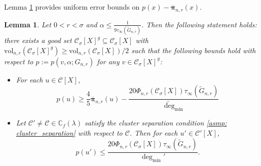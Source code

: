 \documentclass{article}
\newcommand{\vol}{\mathrm{vol}}
\newcommand{\1}{\mathbf{1}}
\newcommand{\pbf}{p}        %
\newcommand{\pibf}{\bm{\pi}}
\newcommand{\Xbf}{X}             %
\newcommand{\Cbb}{\mathbb{C}}
\newcommand{\Cset}{\mathcal{C}}
\newcommand{\Csig}{\Cset_{\sigma}}
\newcommand{\degminpr}{\deg_{\min}'}
\newcommand{\degminwt}{\widetilde{\deg}_{\min}}
\theoremstyle{aldenthm}
\newtheorem{lemma}{Lemma}
\theoremstyle{aldenrmrk}
\begin{document}
Lemma \ref{lem: setup} provides uniform error bounds on $\pbf(x) - \overline{\pibf}_{n,r}(x)$. 

\begin{lemma} 
	\label{lem: setup}
	Let $0 < r < \sigma$ and $\alpha \leq \frac{1}{9 \tau_{\infty}(\widetilde{G}_{n,r})}$. Then the following statement holds: there exists a good set $\Csig[\Xbf]^g \subseteq \Csig[\Xbf]$ with $\vol_{n,r}(\Csig[\Xbf]^g) \geq \vol_{n,r}(\Csig[\Xbf])/2$ such that the following bounds hold with respect to $\pbf := \pbf(v,\alpha;G_{n,r})$ for any $v \in \Csig[\Xbf]^g$:
	\begin{itemize}
		\item For each $u \in \Cset[\Xbf]$,
		\begin{equation}
		\label{eqn: lower_bound_PPR_in_cluster}
		\pbf(u) \geq \frac{4}{5} \overline{\pibf}_{n,r}(u) - \frac{20 \Phi_{n,r}(\Csig[\Xbf]) \tau_{\infty}(\widetilde{G}_{n,r})}{\degminwt}
		\end{equation}
		\item Let $\Cset' \neq \Cset \in \Cbb_f(\lambda)$ satisfy the cluster separation condition \ref{asmp: cluster_separation} with respect to $\Cset$. Then for each $u' \in \Cset'[\Xbf]$,
		\begin{equation}
		\label{eqn: upper_bound_PPR_in_other_cluster}
		\pbf(u') \leq \frac{20 \Phi_{n,r}(\Csig[\Xbf]) \tau_{\infty}(\widetilde{G}_{n,r})}{\degminpr}.
		\end{equation}
	\end{itemize}
\end{lemma}
\end{document}
